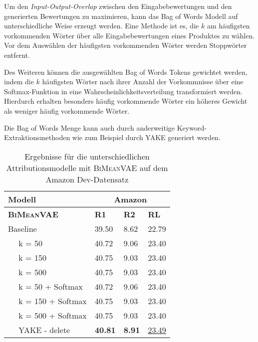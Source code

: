Um den \textit{Input-Output-Overlap} zwischen den Eingabebewertungen und den generierten Bewertungen zu maximieren, kann das Bag of Words Modell auf unterschiedliche Weise erzeugt werden. 
Eine Methode ist es, die $k$ am häufigsten vorkommenden Wörter über alle Eingabebewertungen eines Produktes zu wählen.
Vor dem Auswählen der häufigsten vorkommenden Wörter werden Stoppwörter entfernt.

Des Weiteren können die ausgewählten Bag of Words Tokens gewichtet werden, indem die $k$ häufigsten Wörter nach ihrer Anzahl der Vorkommnisse über eine Softmax-Funktion in eine Wahrscheinlichkeitsverteilung transformiert werden.
Hierdurch erhalten besonders häufig vorkommende Wörter ein höheres Gewicht als weniger häufig vorkommende Wörter.

Die Bag of Words Menge kann auch durch anderweitige Keyword-Extraktionsmethoden wie zum Beispiel durch YAKE \citep{CAMPOS2020257} generiert werden.


\begin{table}[h!]
    \centering
    \begin{tabular}{@{}llll@{}}
    \toprule
                    Modell   & \multicolumn{3}{c}{Amazon}              \\ \midrule
    \textbf{\textsc{BiMeanVAE} }    & \textbf{R1} & \textbf{R2} & \textbf{RL} \\ \midrule
    Baseline        & 39.50       & 8.62    &  22.79     \\
    $\quad$ k = 50       &  40.72    &   9.06    &    23.40   \\
    $\quad$ k = 150  &  40.75   &    9.03  &  23.40  \\
    $\quad$ k = 500 &  40.75   &    9.03  &  23.40  \\
    $\quad$ k = 50 + Softmax    &  40.72    &   9.06    &    23.40   \\
    $\quad$ k = 150 + Softmax  &  40.75   &    9.03  &  23.40  \\
    $\quad$ k = 500 + Softmax   &  40.75   &    9.03  &  23.40  \\
    $\quad$ YAKE - delete&  \textbf{40.81}   &     \textbf{8.91}  &   \underline{23.49}    \\ \bottomrule
    \end{tabular}
    \caption{Ergebnisse für die unterschiedlichen Attributionsmodelle mit \textsc{BiMeanVAE} auf dem Amazon Dev-Datensatz}
    \label{bow_opti}
\end{table}


